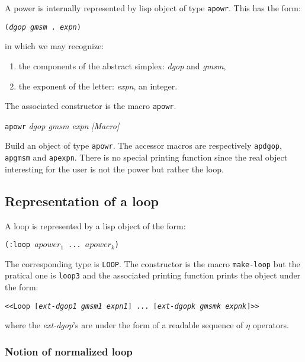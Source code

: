 A power is internally represented by  lisp object of type  {\tt apowr}. This has the form:
\begin{center}
{\tt ({\em dgop} {\em gmsm} . {\em expn})}
\end{center}
in which we may recognize:
\begin{enumerate}
\item the components of the abstract simplex: {\em dgop} and {\em gmsm},
\item the exponent of the letter: {\em expn}, an integer.
\end{enumerate}
The associated  constructor is the macro {\tt apowr}.
\vskip 0.45cm
{\parindent=0mm
{\leftskip=5mm
{\tt apowr} {\em dgop gmsm expn} \hfill {\em [Macro]} \par}
{\leftskip=15mm
Build an object of type  {\tt apowr}.
The accessor macros  are respectively {\tt apdgop},  {\tt apgmsm} and {\tt apexpn}. There
is no special printing function since the real object interesting for the user is not
the power but rather the loop.\par}
}

\subsection{Representation of a loop}

A loop is represented by a lisp object of the form:
\begin{center} {\tt (:loop $apower_1$ ... $apower_k$)} \end{center}
The corresponding type is {\tt LOOP}.
The  constructor is the macro {\tt make-loop} but the pratical one is {\tt loop3} and the associated
printing function prints the object under the form:
\begin{center}
{\tt <<Loop [{\em ext-dgop1 gmsm1} {\em expn1}] ... [{\em ext-dgopk gmsmk} {\em expnk}]>>}
\end{center}
where the {\em ext-dgop}'s are under the form of a readable sequence of $\eta$ operators.

\subsubsection {Notion of normalized loop}

